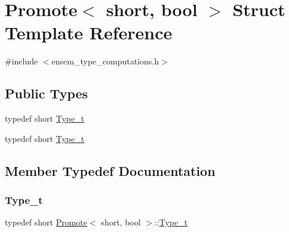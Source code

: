 \hypertarget{structPromote_3_01short_00_01bool_01_4}{}\section{Promote$<$ short, bool $>$ Struct Template Reference}
\label{structPromote_3_01short_00_01bool_01_4}


{\ttfamily \#include $<$ensem\+\_\+type\+\_\+computations.\+h$>$}

\subsection*{Public Types}
\begin{DoxyCompactItemize}
\item 
typedef short \mbox{\hyperlink{structPromote_3_01short_00_01bool_01_4_a4f4ef8db654939c693bf155cff1e36a3}{Type\+\_\+t}}
\item 
typedef short \mbox{\hyperlink{structPromote_3_01short_00_01bool_01_4_a4f4ef8db654939c693bf155cff1e36a3}{Type\+\_\+t}}
\end{DoxyCompactItemize}


\subsection{Member Typedef Documentation}
\mbox{\label{structPromote_3_01short_00_01bool_01_4_a4f4ef8db654939c693bf155cff1e36a3}} 
\subsubsection{\texorpdfstring{Type\_t}{Type\_t}\hspace{0.1cm}{\footnotesize\ttfamily [1/2]}}
{\footnotesize\ttfamily typedef short \mbox{\hyperlink{structPromote}{Promote}}$<$ short, bool $>$\+::\mbox{\hyperlink{structPromote_3_01short_00_01bool_01_4_a4f4ef8db654939c693bf155cff1e36a3}{Type\+\_\+t}}}

\mbox{\label{structPromote_3_01short_00_01bool_01_4_a4f4ef8db654939c693bf155cff1e36a3}} 
